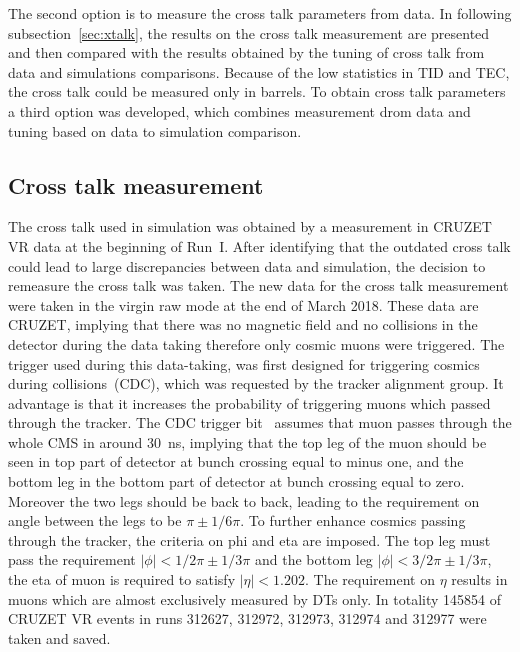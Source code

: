 
The second option is to measure the cross talk parameters from data. In following subsection~\ref{sec:xtalk}, the results on the cross talk measurement are presented and then compared with the results obtained by the tuning of cross talk from data and simulations comparisons. Because of the low statistics in TID and TEC, the cross talk could be measured only in barrels. To obtain cross talk parameters a third option was developed, which combines measurement drom data and tuning based on data to simulation comparison.

\subsection{Cross talk  measurement~\label{sec:xtalk}}

The cross talk used in simulation was obtained by a measurement in CRUZET VR data at the beginning of Run~I. After identifying that the outdated cross talk could lead to large discrepancies between data and simulation, the decision  to remeasure the cross talk was taken. The new data for the cross talk measurement were taken in the virgin raw mode at the end of March 2018. These data are CRUZET, implying that there was no magnetic field and no collisions in the detector during the data taking therefore only cosmic muons were triggered. The trigger used during this data-taking, was first designed for triggering cosmics during collisions~(CDC), which was requested by the tracker alignment group. It advantage is that it increases the probability of triggering muons which passed through the tracker. The CDC trigger bit~\cite{website:trigger} assumes that muon passes through the whole CMS in around 30~ns, implying that the top leg of the muon should be seen in top part of detector at bunch crossing equal to minus one, and the bottom leg in the bottom part of detector at bunch crossing equal to zero. Moreover the two legs should be back to back, leading to the requirement on angle between the legs to be $\pi \pm 1/6\pi$. To further enhance cosmics passing through the tracker, the criteria on phi and eta are imposed. The top leg must pass the requirement $|\phi|<1/2\pi \pm 1/3\pi$ and the bottom leg $|\phi|<3/2\pi \pm 1/3\pi$, the eta of muon is required to satisfy $|\eta|<1.202$. The requirement on $\eta$ results in muons which are almost exclusively measured by DTs only. In totality 145854 of CRUZET VR events in runs 312627, 312972, 312973, 312974 and 312977 were taken and saved.

